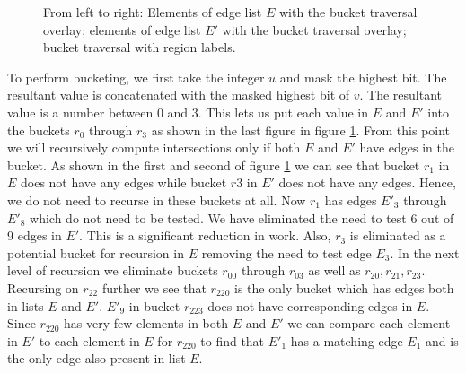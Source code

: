 \documentclass[conference]{IEEEtran}
\begin{document}
\begin{figure}
\caption{\label{fig_radix_bucketing}From left to right: Elements of edge list $E$ with the bucket traversal overlay; elements of edge list $E'$ with the bucket traversal overlay; bucket traversal with region labels.}
\end{figure}

To perform bucketing, we first take the integer $u$ and mask the highest bit. The resultant value is concatenated with the masked highest bit of $v$. The resultant value is a number between 0 and 3. This lets us put each value in $E$ and $E'$ into the buckets $r_0$ through $r_3$ as shown in the last figure in figure \ref{fig_radix_bucketing}. From this point we will recursively compute intersections only if both $E$ and $E'$ have edges in the bucket. As shown in the first and second of figure \ref{fig_radix_bucketing} we can see that bucket $r_1$ in $E$ does not have any edges while bucket $r3$ in $E'$ does not have any edges. Hence, we do not need to recurse in these buckets at all. Now $r_1$ has edges $E'_3$ through $E'_8$ which do not need to be tested. We have eliminated the need to test 6 out of 9 edges in $E'$. This is a significant reduction in work. Also, $r_3$ is eliminated as a potential bucket for recursion in $E$ removing the need to test edge $E_3$. In the next level of recursion we eliminate buckets $r_{00}$ through $r_{03}$ as well as $r_{20}, r_{21}, r_{23}$. Recursing on $r_{22}$ further we see that $r_{220}$ is the only bucket which has edges both in lists $E$ and $E'$. $E'_9$ in bucket $r_{223}$ does not have corresponding edges in $E$. Since $r_{220}$ has very few elements in both $E$ and $E'$ we can compare each element in $E'$ to each element in $E$ for $r_{220}$ to find that $E'_1$ has a matching edge $E_1$ and is the only edge also present in list $E$.
\end{document}

